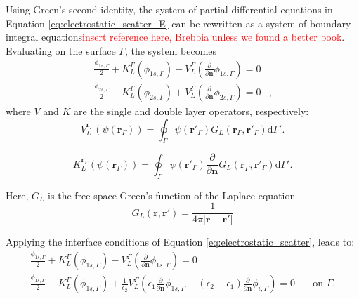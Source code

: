 Using Green's second identity, the system of partial differential equations 
in Equation \eqref{eq:electrostatic_scatter_E} can be rewritten as a system 
of boundary integral equations\textcolor{red}{insert reference here, Brebbia 
unless we found a better book}. Evaluating on the surface $\Gamma$, the system
becomes
%
\begin{align} \label{eq:integral_eq_lspr_nobc}
\frac{\phi_{1s,\Gamma}}{2}+ K_{L}^{\Gamma}(\phi_{1s,\Gamma}) - V_{L}^{\Gamma} \left(\frac{\partial}{\partial \mathbf{n}}\phi_{1s,\Gamma} \right) = 0&  \nonumber \\
\frac{\phi_{2s,\Gamma}}{2} - K_{L}^{\Gamma}(\phi_{2s,\Gamma}) + V_{L}^{\Gamma} \left( \frac{\partial}{\partial \mathbf{n}} \phi_{2s,\Gamma} \right) = 0&,
\end{align}
%
where $V$ and $K$ are the single and double layer operators, respectively:
%
\begin{equation}\label{eq:single_layer}
V^{\mathbf{r}_\Gamma}_L (\psi(\mathbf{r}_\Gamma)) = \oint_\Gamma \psi(\mathbf{r}'_\Gamma) G_L(\mathbf{r}_\Gamma, \mathbf{r}'_\Gamma) \text{d} \Gamma'.
\end{equation}

\begin{equation}\label{eq:double_layer}
K^{\mathbf{r}_\Gamma}_L (\psi(\mathbf{r}_\Gamma)) = \oint_\Gamma \psi(\mathbf{r}'_\Gamma) \frac{\partial}{\partial \mathbf{n}}G_L(\mathbf{r}_\Gamma, \mathbf{r}'_\Gamma) \text{d} \Gamma'.
\end{equation}
%

Here, $G_L$ is the free space Green's function of the Laplace equation
%
\begin{equation}
G_L(\mathbf{r},\mathbf{r}') = \frac{1}{4\pi|\mathbf{r}-\mathbf{r}'|}
\end{equation}

Applying the interface conditions of Equation \eqref{eq:electrostatic_scatter},
leads to:
%
\begin{align} \label{eq:integral_eq_lspr}
\frac{\phi_{1s,\Gamma}}{2}+ K_{L}^{\Gamma}(\phi_{1s,\Gamma}) - V_{L}^{\Gamma} \left(\frac{\partial}{\partial \mathbf{n}}\phi_{1s,\Gamma} \right) = 0&  \nonumber \\
\frac{\phi_{1s,\Gamma}}{2} - K_{L}^{\Gamma}(\phi_{1s,\Gamma}) + \frac{1}{\epsilon_2}V_{L}^{\Gamma} \left( \epsilon_1 \frac{\partial}{\partial \mathbf{n}} \phi_{1s,\Gamma} - (\epsilon_2-\epsilon_1) \frac{\partial}{\partial \mathbf{n}} \phi_{i,\Gamma} \right) = 0& \quad \text{on $\Gamma$.}
\end{align}

